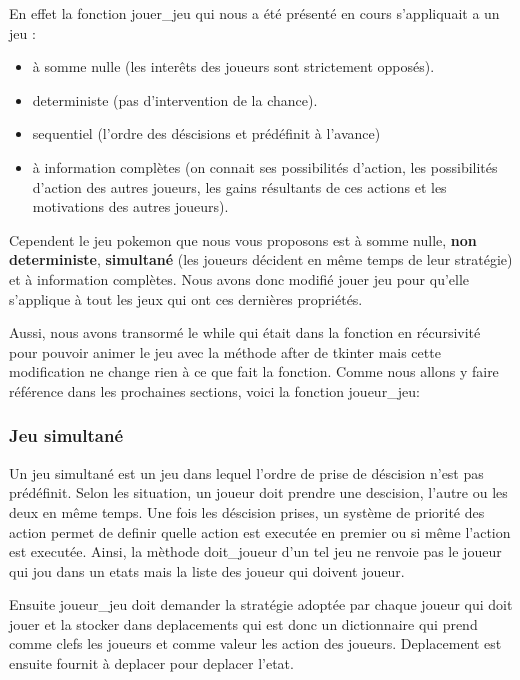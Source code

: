         En effet la fonction jouer\_jeu qui nous a été présenté en cours s'appliquait a un jeu :
        \begin{itemize}
            \item à somme nulle (les interêts des joueurs sont strictement opposés).
            \item deterministe (pas d'intervention de la chance).
            \item sequentiel (l'ordre des déscisions et prédéfinit à l'avance)
            \item à information complètes (on connait ses possibilités d'action, les possibilités d'action des autres joueurs, les gains résultants de ces actions et les motivations des autres joueurs).
        \end{itemize}
        Cependent le jeu pokemon que nous vous proposons est à somme nulle, \textbf{non deterministe}, \textbf{simultané} (les joueurs décident en même temps de leur stratégie) et à information complètes.
        Nous avons donc modifié jouer jeu pour qu'elle s'applique à tout les jeux qui ont ces dernières propriétés.
        
        Aussi, nous avons transormé le while qui était dans la fonction en récursivité pour pouvoir animer le jeu avec la méthode after de tkinter mais cette modification ne change rien à ce que fait la fonction.
        Comme nous allons y faire référence dans les prochaines sections, voici la fonction joueur\_jeu:
        
        
        
        \subsubsection{Jeu simultané}
            Un jeu simultané est un jeu dans lequel l'ordre de prise de déscision n'est pas prédéfinit. Selon les situation, un joueur doit prendre une descision, l'autre ou les deux en même temps. Une fois les déscision prises, un système de priorité des action permet de definir quelle action est executée en premier ou si même l'action est executée.
            Ainsi, la mèthode doit\_joueur d'un tel jeu ne renvoie pas le joueur qui jou dans un etats mais la liste des joueur qui doivent joueur.
            
            Ensuite joueur\_jeu doit demander la stratégie adoptée par chaque joueur qui doit jouer et la stocker dans deplacements qui est donc un dictionnaire qui prend comme clefs les joueurs et comme valeur les action des joueurs.
            Deplacement est ensuite fournit à deplacer pour deplacer l'etat.
